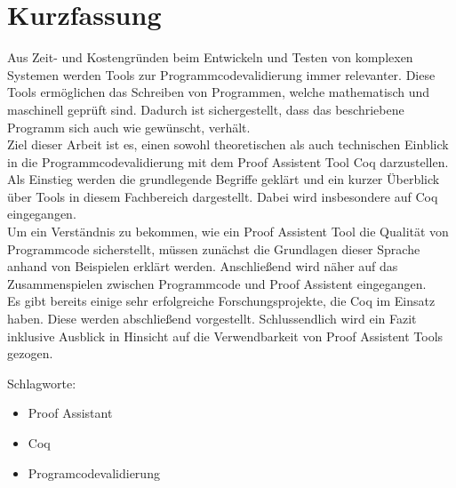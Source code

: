 \section*{Kurzfassung}
\thispagestyle{empty}
Aus Zeit- und Kostengründen beim Entwickeln und Testen von komplexen Systemen werden Tools zur Programmcodevalidierung immer relevanter.
Diese Tools ermöglichen das Schreiben von Programmen, welche mathematisch und maschinell geprüft sind. Dadurch ist sichergestellt, dass das beschriebene Programm sich auch wie gewünscht, verhält.\\
Ziel dieser Arbeit ist es, einen sowohl theoretischen als auch technischen Einblick in die Programmcodevalidierung mit dem Proof Assistent Tool Coq darzustellen.
Als Einstieg werden die grundlegende Begriffe geklärt und ein kurzer Überblick über Tools in diesem Fachbereich dargestellt. Dabei wird insbesondere auf Coq eingegangen.\\
Um ein Verständnis zu bekommen, wie ein Proof Assistent Tool die Qualität von Programmcode sicherstellt, müssen zunächst die Grundlagen dieser Sprache anhand von Beispielen erklärt werden. Anschließend wird näher auf das Zusammenspielen zwischen Programmcode und Proof Assistent eingegangen.\\
Es gibt bereits einige sehr erfolgreiche Forschungsprojekte, die Coq im Einsatz haben. Diese werden abschließend vorgestellt. Schlussendlich wird ein Fazit inklusive Ausblick in Hinsicht auf die Verwendbarkeit von Proof Assistent Tools gezogen.
\bigskip

\noindent
Schlagworte:
\begin{itemize}
	\item Proof Assistant
	\item Coq
	\item Programcodevalidierung
\end{itemize}


